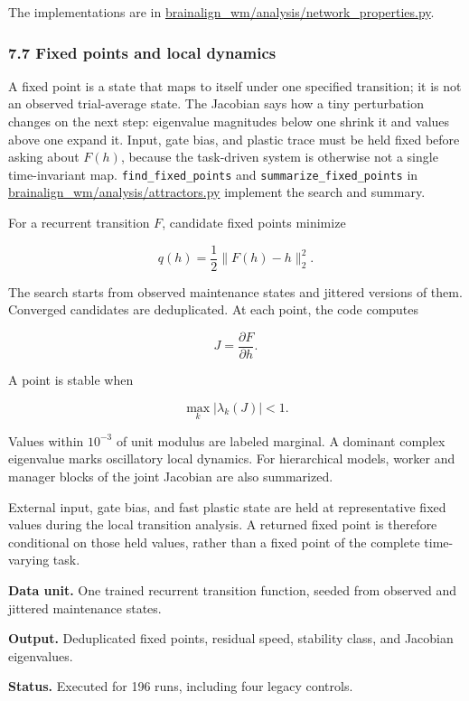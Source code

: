 \documentclass[
  10pt,
]{article}
\begin{document}
The implementations are in
\url{brainalign_wm/analysis/network_properties.py}.

\hypertarget{fixed-points-and-local-dynamics}{%
\subsubsection{7.7 Fixed points and local
dynamics}\label{fixed-points-and-local-dynamics}}

A fixed point is a state that maps to itself under one specified
transition; it is not an observed trial-average state. The Jacobian says
how a tiny perturbation changes on the next step: eigenvalue magnitudes
below one shrink it and values above one expand it. Input, gate bias,
and plastic trace must be held fixed before asking about \(F(h)\),
because the task-driven system is otherwise not a single time-invariant
map. \texttt{find\_fixed\_points} and \texttt{summarize\_fixed\_points}
in \url{brainalign_wm/analysis/attractors.py} implement the search and
summary.

For a recurrent transition \(F\), candidate fixed points minimize

\[
q(h)=\frac12\lVert F(h)-h\rVert_2^2.
\]

The search starts from observed maintenance states and jittered versions
of them. Converged candidates are deduplicated. At each point, the code
computes

\[
J=\frac{\partial F}{\partial h}.
\]

A point is stable when

\[
\max_k|\lambda_k(J)|<1.
\]

Values within \(10^{-3}\) of unit modulus are labeled marginal. A
dominant complex eigenvalue marks oscillatory local dynamics. For
hierarchical models, worker and manager blocks of the joint Jacobian are
also summarized.

External input, gate bias, and fast plastic state are held at
representative fixed values during the local transition analysis. A
returned fixed point is therefore conditional on those held values,
rather than a fixed point of the complete time-varying task.

\textbf{Data unit.} One trained recurrent transition function, seeded
from observed and jittered maintenance states.

\textbf{Output.} Deduplicated fixed points, residual speed, stability
class, and Jacobian eigenvalues.

\textbf{Status.} Executed for 196 runs, including four legacy controls.
\end{document}
